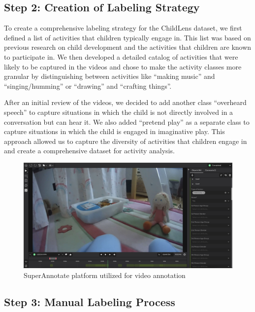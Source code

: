 \documentclass[
  man,floatsintext]{apa6}
\begin{document}
\subsection{Step 2: Creation of Labeling Strategy}\label{step-2-creation-of-labeling-strategy}

To create a comprehensive labeling strategy for the ChildLens dataset, we first defined a list of activities that children typically engage in. This list was based on previous research on child development and the activities that children are known to participate in. We then developed a detailed catalog of activities that were likely to be captured in the videos and chose to make the activity classes more granular by distinguishing between activities like ``making music'' and ``singing/humming'' or ``drawing'' and ``crafting things''.

After an initial review of the videos, we decided to add another class ``overheard speech'' to capture situations in which the child is not directly involved in a conversation but can hear it. We also added ``pretend play'' as a separate class to capture situations in which the child is engaged in imaginative play. This approach allowed us to capture the diversity of activities that children engage in and create a comprehensive dataset for activity analysis.

\begin{figure}

{\centering \includegraphics[width=5.76in]{images/SuperAnnotate} 

}

\caption{SuperAnnotate platform utilized for video annotation}\label{fig:superannotate}
\end{figure}

\subsection{Step 3: Manual Labeling Process}\label{step-3-manual-labeling-process}
\end{document}
